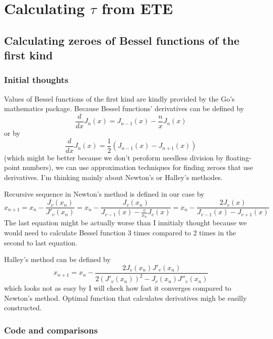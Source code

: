 \documentclass[a4paper]{article}
\begin{document}
	\section{Calculating $\tau$ from ETE}
	\subsection{Calculating zeroes of Bessel functions of the first kind}
	\subsubsection{Initial thoughts}
	Values of Bessel functions of the first kind are
	kindly provided by the Go's mathematics package.
	Because Bessel functions' derivatives can be defined by 
	\begin{equation*}
		\frac{d}{dx}J_n(x) = J_{n-1}(x) - \frac{n}{x}J_n(x)
	\end{equation*}
	or by
	\begin{equation*}
		\frac{d}{dx}J_n(x) = \frac{1}{2}(J_{n-1}(x) - J_{n+1}(x))
	\end{equation*}
	(which might be better because we don't peroform needless division by floating-point numbers),
	we can use approximation techniques for finding zeroes that use derivatives.
	I'm thinking mainly about Newton's or Halley's methodes.

	Recursive sequence in Newton's method is defined in our case by
	\begin{equation*}
		x_{n+1} = x_n - \frac{J_v(x_n)}{J'_v(x_n)} = 
			x_n - \frac{J_v(x_n)}{J_{v-1}(x) - \frac{v}{x_n}J_v(x)} =
			x_n - \frac{2J_v(x)}{J_{v-1}(x) - J_{v+1}(x)}
	\end{equation*}
	The last equation might be actually worse than I innitialy thought
	because we would need to calculate Bessel function 3 times compared to 2 times
	in the second to last equation.

	Halley's method can be defined by
	\begin{equation*}
		x_{n+1} = x_n - \frac{2J_v(x_n)J'_v(x_n)}{2(J'_v(x_n))^2 - J_v(x_n)J''_v(x_n)}
	\end{equation*}
	which looks not as easy by I will check how fast it converges compared to
	Newton's method. Optimal function that calculates derivatives migh be easilly constructed.
	\subsubsection{Code and comparisons}
\end{document}
